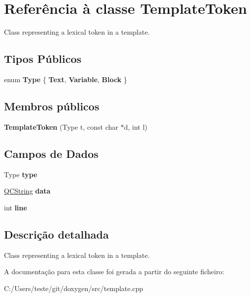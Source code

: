 \hypertarget{class_template_token}{\section{Referência à classe Template\-Token}
\label{class_template_token}
}


Class representing a lexical token in a template.  


\subsection*{Tipos Públicos}
\begin{DoxyCompactItemize}
\item 
enum {\bfseries Type} \{ {\bfseries Text}, 
{\bfseries Variable}, 
{\bfseries Block}
 \}
\end{DoxyCompactItemize}
\subsection*{Membros públicos}
\begin{DoxyCompactItemize}
\item 
\hypertarget{class_template_token_ab9e83e1420dffe3b0a7560b4fa302831}{{\bfseries Template\-Token} (Type t, const char $\ast$d, int l)}\label{class_template_token_ab9e83e1420dffe3b0a7560b4fa302831}

\end{DoxyCompactItemize}
\subsection*{Campos de Dados}
\begin{DoxyCompactItemize}
\item 
\hypertarget{class_template_token_ab6f4e6d3fde00ce906e46494f60dfe7a}{Type {\bfseries type}}\label{class_template_token_ab6f4e6d3fde00ce906e46494f60dfe7a}

\item 
\hypertarget{class_template_token_abe1a29fcadb8f125b95dad2baffd0c15}{\hyperlink{class_q_c_string}{Q\-C\-String} {\bfseries data}}\label{class_template_token_abe1a29fcadb8f125b95dad2baffd0c15}

\item 
\hypertarget{class_template_token_a41ebd28ef1d7c6ade45642cb6acc1039}{int {\bfseries line}}\label{class_template_token_a41ebd28ef1d7c6ade45642cb6acc1039}

\end{DoxyCompactItemize}


\subsection{Descrição detalhada}
Class representing a lexical token in a template. 

A documentação para esta classe foi gerada a partir do seguinte ficheiro\-:\begin{DoxyCompactItemize}
\item 
C\-:/\-Users/teste/git/doxygen/src/template.\-cpp\end{DoxyCompactItemize}
